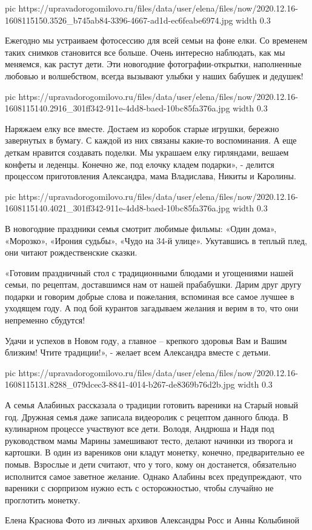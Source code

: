 \ifcmt
  pic https://upravadorogomilovo.ru/files/data/user/elena/files/now/2020.12.16-1608115150.3526_b745ab84-3396-4667-ad1d-ec6feabe6974.jpg
  width 0.3
  
\fi


Ежегодно мы устраиваем фотосессию для всей семьи на фоне елки. Со временем
таких снимков становится все больше. Очень интересно наблюдать, как мы
меняемся, как растут дети. Эти новогодние фотографии-открытки, наполненные
любовью и волшебством, всегда вызывают улыбки у наших бабушек и дедушек!

\ifcmt
  pic https://upravadorogomilovo.ru/files/data/user/elena/files/now/2020.12.16-1608115140.2916_301ff342-911e-4dd8-baed-10bc85fa376a.jpg
  width 0.3
  
\fi


Наряжаем елку все вместе. Достаем из коробок старые игрушки, бережно завернутых
в бумагу. С каждой из них связаны какие-то воспоминания. А еще деткам нравится
создавать поделки. Мы украшаем елку гирляндами, вешаем конфеты и леденцы.
Конечно же, под елочку кладем подарки», - делится процессом приготовления
Александра, мама Владислава, Никиты и Каролины.

\ifcmt
  pic https://upravadorogomilovo.ru/files/data/user/elena/files/now/2020.12.16-1608115140.4021_301ff342-911e-4dd8-baed-10bc85fa376a.jpg
  width 0.3
  
\fi


В новогодние праздники семья смотрит любимые фильмы: «Один дома», «Морозко»,
«Ирония судьбы», «Чудо на 34-й улице». Укутавшись в теплый плед, они читают
рождественские сказки.

«Готовим праздничный стол с традиционными блюдами и угощениями нашей семьи, по
рецептам, доставшимся нам от нашей прабабушки. Дарим друг другу подарки и
говорим добрые слова и пожелания, вспоминая все самое лучшее в уходящем году. А
под бой курантов загадываем желания и верим в то, что они непременно сбудутся!

Удачи и успехов в Новом году, а главное – крепкого здоровья Вам и Вашим
близким! Чтите традиции!», - желает всем Александра вместе с детьми.

\ifcmt
  pic https://upravadorogomilovo.ru/files/data/user/elena/files/now/2020.12.16-1608115131.8288_079dcec3-8841-4014-b267-de8369b76d2b.jpg
  width 0.3
  
\fi


А семья Алабиных рассказала о традиции готовить вареники на Старый новый год.
Дружная семья даже записала видеоролик с рецептом данного блюда. В кулинарном
процессе участвуют все дети. Володя, Андрюша и Надя под руководством мамы
Марины замешивают тесто, делают начинки из творога и картошки. В один из
вареников они кладут монетку, конечно, предварительно ее помыв. Взрослые и дети
считают, что у того, кому он достанется, обязательно исполнится самое заветное
желание. Однако Алабины всех предупреждают, что вареники с сюрпризом нужно есть
с осторожностью, чтобы случайно не проглотить монетку.

Елена Краснова Фото из личных архивов Александры Росс и Анны Колыбиной



